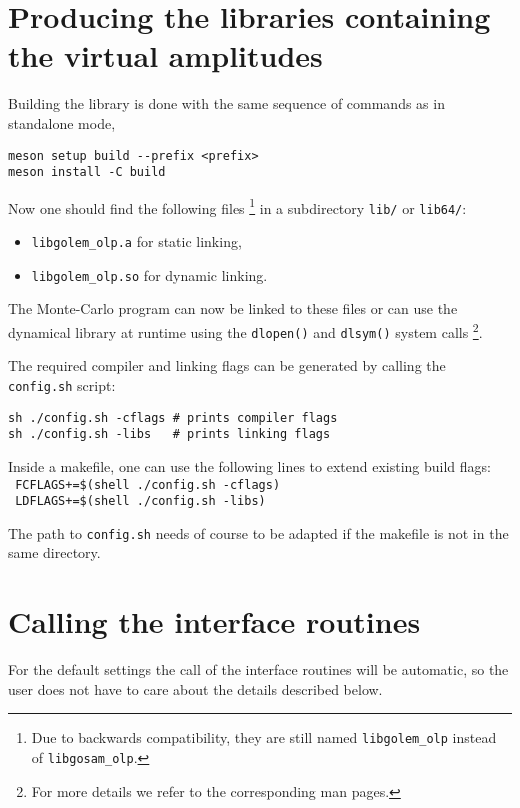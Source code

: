 \section{Producing the libraries containing the virtual amplitudes}

Building the library is done with the same sequence of commands as in standalone mode,

\begin{lstlisting}[style=sh]
meson setup build --prefix <prefix> 
meson install -C build
\end{lstlisting}

Now one should find the following files%
\footnote{Due to backwards compatibility, they are still named \texttt{libgolem\_olp} instead of \texttt{libgosam\_olp}.}
in a subdirectory \texttt{lib/} or \texttt{lib64/}:
\begin{itemize}
\item \texttt{libgolem\_olp.a} for static linking,
\item \texttt{libgolem\_olp.so} for dynamic linking.
\end{itemize}

The Monte-Carlo program can now be linked to these files or can
use the dynamical library at runtime using the \texttt{dlopen()} and \texttt{dlsym()} system calls%
\footnote{For more details we refer to the corresponding man pages.}.

The required compiler and linking flags can be generated by calling the \texttt{config.sh} script:\\
\begin{lstlisting}[style=sh]
sh ./config.sh -cflags # prints compiler flags 
sh ./config.sh -libs   # prints linking flags
\end{lstlisting}

Inside a makefile, one can use the following lines to extend existing build flags:\\
\texttt{ FCFLAGS+=\$(shell ./config.sh -cflags)} \\
\texttt{ LDFLAGS+=\$(shell ./config.sh -libs)}

The path to \texttt{config.sh} needs of course to be adapted if the makefile is not in the
same directory.

\section{Calling the interface routines}

For the default settings the call of the interface routines 
will be automatic, so the user does not have to care about the details described below.

